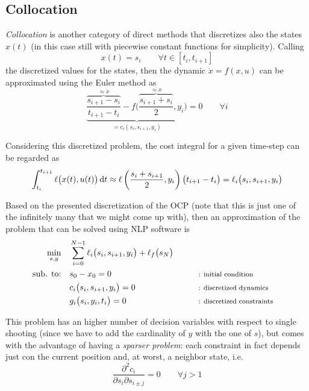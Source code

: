 \subsection{Collocation}
	\textit{Collocation} is another category of direct methods that discretizes also the states $x(t)$ (in this case still with piecewise constant functions for simplicity). Calling
	\[ x(t) = s_i \qquad \forall t \in [t_i,t_{i+1}] \]
	the discretized values for the states, then the dynamic $\dot x = f(x,u)$ can be approximated using the Euler method as
	\begin{equation}
		\underbrace{ \overbrace{\frac{s_{i+1} - s_i}{t_{i+1} - t_i}}^{\approx \dot x} - f\Big( \overbrace{\frac{s_{i+1} + s_i}{2}}^{\approx x}, y_i \Big)}_{= c_i(s_i, s_{i+1}, y_i)} = 0 \qquad \forall i
	\end{equation}
	
	Considering this discretized problem, the cost integral for a given time-step can be regarded as
	\[ \int_{t_i}^{t_{i+1}} \ell\big(x(t), u(t)\big) \, \mathrm{d} t \approx \ell\left(\frac{s_i + s_{i+1}}{2}, y_i\right) \big(t_{i+1} - t_i\big) = \ell_i\big(s_i, s_{i+1}, y_i\big) \]
	
	Based on the presented discretization of the OCP (note that this is just one of the infinitely many that we might come up with), then an approximation of the problem that can be solved using NLP software is
	\begin{equation}
	\begin{aligned}
		\min_{s,y} \quad & \sum_{i=0}^{N-1} \ell_i\big(s_i, s_{i+1},y_i\big) + \ell_f\big(s_N\big) \\
		\textrm{sub. to:} \quad & s_0 - x_0 = 0 &\qquad& {\footnotesize\textrm{: initial condition}} \\
		& c_i\big(s_i, s_{i+1}, y_i\big) = 0 &\qquad& {\footnotesize\textrm{: discretized dynamics}} \\
		& g_i\big(s_i, y_i, t_i\big) = 0 &\qquad& {\footnotesize\textrm{: discretized constraints}}
	\end{aligned}
	\end{equation}
	
	This problem has an higher number of decision variables with respect to single shooting (since we have to add the cardinality of $y$ with the one of $s$), but comes with the advantage of having a \textit{sparser problem}: each constraint in fact depends just con the current position and, at worst, a neighbor state, i.e.
	\[ \frac{\partial^2 c_i}{\partial s_i \partial s_{i\pm j}} = 0 \qquad \forall j > 1 \]
	
